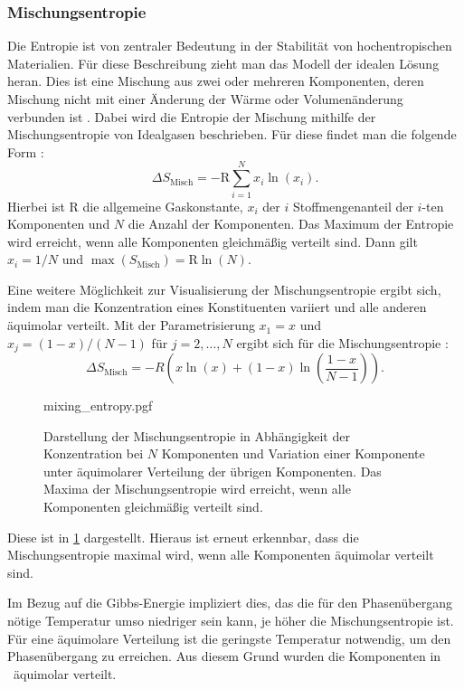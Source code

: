 \subsubsection{Mischungsentropie}
Die Entropie ist von zentraler Bedeutung in der Stabilität von hochentropischen Materialien.
Für diese Beschreibung zieht man das Modell der idealen Lösung heran.
Dies ist eine Mischung aus zwei oder mehreren Komponenten, deren Mischung nicht mit einer Änderung der
Wärme oder Volumenänderung verbunden ist \autocite{DeHoff2006}.
Dabei wird die Entropie der Mischung mithilfe der Mischungsentropie von Idealgasen beschrieben.
Für diese findet man die folgende Form \autocite{rost_phd}:
\begin{equation}
    \Delta S_{\text{Misch}} = -\mathrm{R} \sum_{i=1}^N x_{i} \ln(x_{i}).
    \label{eq:Mischungsentropie}
\end{equation}
Hierbei ist $\mathrm{R}$ die allgemeine Gaskonstante, $x_{i}$ der $i$ Stoffmengenanteil der $i$-ten Komponenten und
$N$ die Anzahl der Komponenten.
Das Maximum der Entropie wird erreicht, wenn alle Komponenten gleichmäßig verteilt sind.
Dann gilt $x_{i}=1/N$ und $\max(S_{\text{Misch}}) = \mathrm{R} \ln(N)$.

Eine weitere Möglichkeit zur Visualisierung der Mischungsentropie ergibt sich, indem man die Konzentration eines
Konstituenten variiert und alle anderen äquimolar verteilt.
Mit der Parametrisierung $x_{1} = x$ und $x_{j} = (1-x) / (N-1)$ für $j=2, \dots, N$ ergibt sich für die
Mischungsentropie \autocite{Rost2015}:
\begin{equation}
    \Delta S_{\text{Misch}} = -R \left( x \ln(x) + (1-x) \ln \left( \frac{1-x}{N-1} \right) \right).
    \label{eq:Mischungsentropie2}
\end{equation}
\begin{figure}
    \centering
    {mixing_entropy.pgf}
    \caption{Darstellung der Mischungsentropie in Abhängigkeit der Konzentration bei $N$ Komponenten und Variation einer
    Komponente unter äquimolarer Verteilung der übrigen Komponenten.
    Das Maxima der Mischungsentropie wird erreicht, wenn alle Komponenten gleichmäßig verteilt sind.
    }
    \label{fig:Mischungsentropie}
\end{figure}

Diese ist in \cref{fig:Mischungsentropie} dargestellt.
Hieraus ist erneut erkennbar, dass die Mischungsentropie maximal wird, wenn alle Komponenten äquimolar verteilt sind.

Im Bezug auf die Gibbs-Energie impliziert dies, das die für den Phasenübergang nötige Temperatur umso niedriger sein
kann, je höher die Mischungsentropie ist.
Für eine äquimolare Verteilung ist die geringste Temperatur notwendig, um den Phasenübergang zu erreichen.
Aus diesem Grund wurden die Komponenten in \heo\ äquimolar verteilt.


